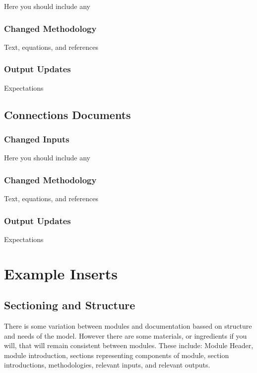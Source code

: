 \documentclass[
  letterpaper,
  oneside,
  openany]{scrbook}
\begin{document}
Here you should include any

\subsection{Changed Methodology}\label{changed-methodology-3}

Text, equations, and references

\subsection{Output Updates}\label{output-updates-3}

Expectations

\section{Connections Documents}\label{connections-documents}

\subsection{Changed Inputs}\label{changed-inputs-4}

Here you should include any

\subsection{Changed Methodology}\label{changed-methodology-4}

Text, equations, and references

\subsection{Output Updates}\label{output-updates-4}

Expectations


\chapter{Example Inserts}\label{example-inserts}

\section{Sectioning and Structure}\label{sectioning-and-structure}

There is some variation between modules and documentation bassed on
structure and needs of the model. However there are some materials, or
ingredients if you will, that will remain consistent between modules.
These include: Module Header, module introduction, sections representing
components of module, section introductions, methodologies, relevant
inputs, and relevant outputs.
\end{document}
